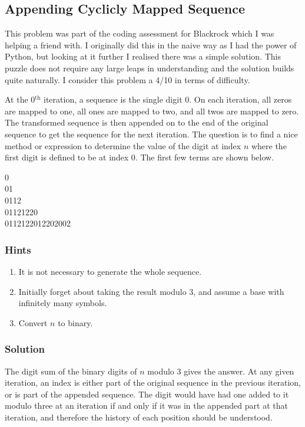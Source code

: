 \subsection{Appending Cyclicly Mapped Sequence}

This problem was part of the coding assessment for Blackrock which I was helping a friend with. I originally did this in the naive way as I had the power of Python, but looking at it further I realised there was a simple solution. This puzzle does not require any large leaps in understanding and the solution builds quite naturally. I consider this problem a 4/10 in terms of difficulty.

At the 0$^\text{th}$ iteration, a sequence is the single digit 0. On each iteration, all zeros are mapped to one, all ones are mapped to two, and all twos are mapped to zero. The transformed sequence is then appended on to the end of the original sequence to get the sequence for the next iteration. The question is to find a nice method or expression to determine the value of the digit at index $n$ where the first digit is defined to be at index 0. The first few terms are shown below.

\begin{center}
    0  \\
    01  \\
    0112  \\
    01121220  \\
    0112122012202002
\end{center}

\subsubsection{Hints}

\begin{enumerate}
    \item It is not necessary to generate the whole sequence.
    \item Initially forget about taking the result modulo 3, and assume a base with infinitely many symbols.
    \item Convert $n$ to binary.
\end{enumerate}

\subsubsection{Solution}

The digit sum of the binary digits of $n$ modulo 3 gives the answer. At any given iteration, an index is either part of the original sequence in the previous iteration, or is part of the appended sequence. The digit would have had one added to it modulo three at an iteration if and only if it was in the appended part at that iteration, and therefore the history of each position should be understood.

